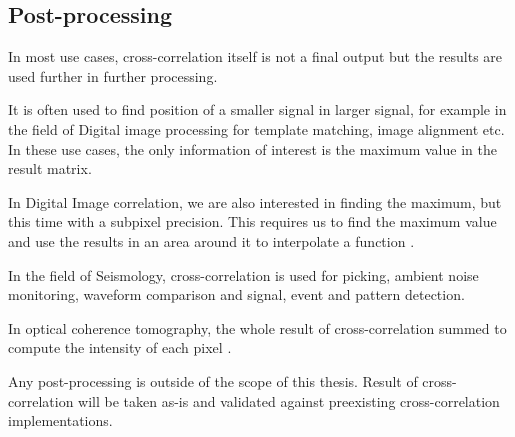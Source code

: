 

\subsection{Post-processing}

In most use cases, cross-correlation itself is not a final output but the results are used further in further processing.

It is often used to find position of a smaller signal in larger signal, for example in the field of Digital image processing for template matching, image alignment etc. In these use cases, the only information of interest is the maximum value in the result matrix. 

In Digital Image correlation, we are also interested in finding the maximum, but this time with a subpixel precision. This requires us to find the maximum value and use the results in an area around it to interpolate a function \citep{zhang2015} \citep{misko}.

In the field of Seismology, cross-correlation is used for picking, ambient noise monitoring, waveform comparison and signal, event and pattern detection. \citep{Ventosa2019}
 
In optical coherence tomography, the whole result of cross-correlation summed to compute the intensity of each pixel \citep{Kapinchev2015}. 

Any post-processing is outside of the scope of this thesis. Result of cross-correlation will be taken as-is and validated against preexisting cross-correlation implementations.


